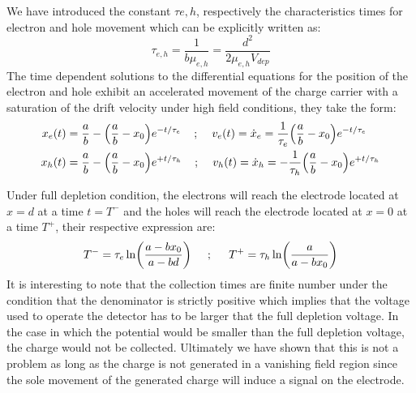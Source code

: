 		We have introduced the constant $\tau{e,h}$, respectively the characteristics times for electron and hole movement which can be explicitly written as: 
		\begin{equation}
			\tau_{e,h} = \frac{1}{b \mu_{e,h}} = \frac{d^2}{2\mu_{e,h}V_{dep}}
		\end{equation}
		The time dependent solutions to the differential equations for the position of the electron and hole exhibit an accelerated movement of the charge carrier with a saturation of the drift velocity under high field conditions, they take the form:  
		\begin{equation}
			\begin{split}
				x_e(t) &= \frac{a}{b} - {\left( \frac{a}{b} -x_0 \right)} e^{-t/\tau_e} \hspace{4mm} ; \hspace{4mm} v_e(t) = \dot{x}_e = \frac{1}{\tau_e}{\left( \frac{a}{b} -x_0 \right)}e^{-t/\tau_e} \\
				x_h(t) &= \frac{a}{b} - {\left( \frac{a}{b} -x_0 \right)} e^{+t/\tau_h} \hspace{4mm} ; \hspace{4mm} v_h(t) = \dot{x}_h = -\frac{1}{\tau_h}{\left( \frac{a}{b} -x_0 \right)}e^{+t/\tau_h}
			\end{split}
		\end{equation}

		Under full depletion condition, the electrons will reach the electrode located at $x = d$ at a time $t = T^-$ and the holes will reach the electrode located at $x=0$ at a time $T^+$, their respective expression are: 
		\begin{equation}
			T^- = \tau_e \ln(\frac{a-bx_0}{a-bd}) \hspace{5mm} ; \hspace{5mm} T^+ = \tau_h \ln(\frac{a}{a-bx_0})
		\end{equation}
		It is interesting to note that the collection times are finite number under the condition that the denominator is strictly positive which implies that the voltage used to operate the detector has to be larger that the full depletion voltage. In the case in which the potential would be smaller than the full depletion voltage, the charge would not be collected. Ultimately we have shown that this is not a problem as long as the charge is not generated in a vanishing field region since the sole movement of the generated charge will induce a signal on the electrode. 
		
